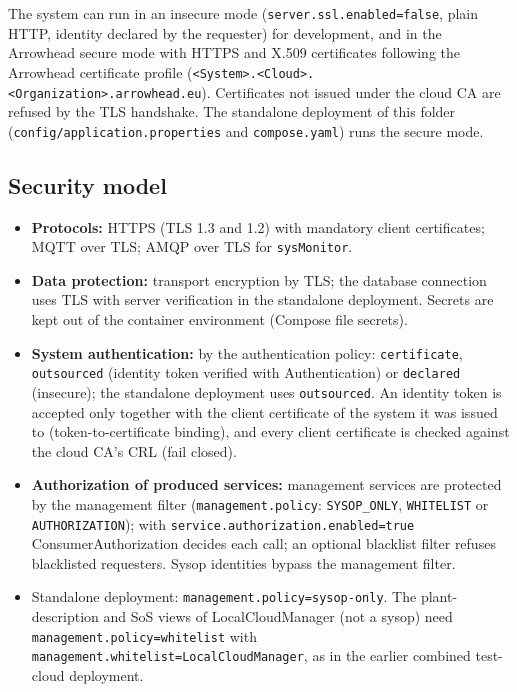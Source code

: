 \documentclass[a4paper]{arrowhead}
\begin{document}
The system can run in an insecure mode (\texttt{server.ssl.enabled=false}, plain HTTP, identity declared by the requester) for development, and in the Arrowhead secure mode with HTTPS and X.509 certificates following the Arrowhead certificate profile (\texttt{<System>.<Cloud>.<Organization>.arrowhead.eu}). Certificates not issued under the cloud CA are refused by the TLS handshake. The standalone deployment of this folder (\texttt{config/\allowbreak{}application.\allowbreak{}properties} and \texttt{compose.yaml}) runs the secure mode.

\subsection{Security model}


\begin{itemize}
  \item \textbf{Protocols:} HTTPS (TLS 1.3 and 1.2) with mandatory client certificates; MQTT over TLS; AMQP over TLS for \texttt{sysMonitor}.
  \item \textbf{Data protection:} transport encryption by TLS; the database connection uses TLS with server verification in the standalone deployment. Secrets are kept out of the container environment (Compose file secrets).
  \item \textbf{System authentication:} by the authentication policy: \texttt{certificate}, \texttt{outsourced} (identity token verified with Authentication) or \texttt{declared} (insecure); the standalone deployment uses \texttt{outsourced}. An identity token is accepted only together with the client certificate of the system it was issued to (token-to-certificate binding), and every client certificate is checked against the cloud CA's CRL (fail closed).
  \item \textbf{Authorization of produced services:} management services are protected by the management filter (\texttt{management.policy}: \texttt{SYSOP\_ONLY}, \texttt{WHITELIST} or \texttt{AUTHORIZATION}); with \texttt{service.authorization.enabled=true} ConsumerAuthorization decides each call; an optional blacklist filter refuses blacklisted requesters. Sysop identities bypass the management filter.
  \item Standalone deployment: \texttt{management.\allowbreak{}policy=\allowbreak{}sysop-\allowbreak{}only}. The plant-description and SoS views of LocalCloudManager (not a sysop) need \texttt{management.\allowbreak{}policy=\allowbreak{}whitelist} with \texttt{management.\allowbreak{}whitelist=\allowbreak{}LocalCloudManager}, as in the earlier combined test-cloud deployment.
\end{itemize}
\end{document}
